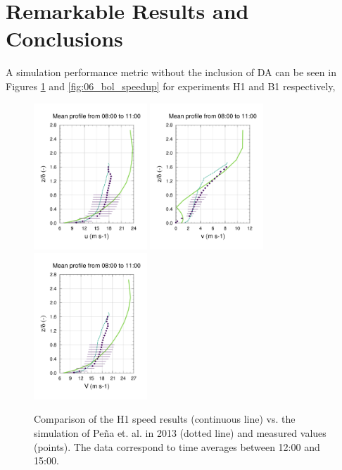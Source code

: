 \section{Remarkable Results and Conclusions}
A simulation performance metric without the inclusion of DA can be seen in Figures \ref{fig:06_hov_pena} and \ref{fig:06_bol_speedup} for experiments H1 and B1 respectively,
\begin{figure}[H]
	\centering
	\includegraphics[height=5.5cm,page=37,trim={10mm 15mm 20mm 35mm},clip]{Imagenes/06/hov/9u}%
	\includegraphics[height=5.5cm,page=37,trim={44mm 15mm 20mm 35mm},clip]{Imagenes/06/hov/9v}%
	\includegraphics[height=5.5cm,page=37,trim={44mm 15mm -20mm 35mm},clip]{Imagenes/06/hov/9vv}%
	\caption{Comparison of the H1 speed results (continuous line) vs. the simulation of Peña et. al. in 2013 (dotted line) and measured values (points). The data correspond to time averages between 12:00 and 15:00.}
	\label{fig:06_hov_pena}
\end{figure}
